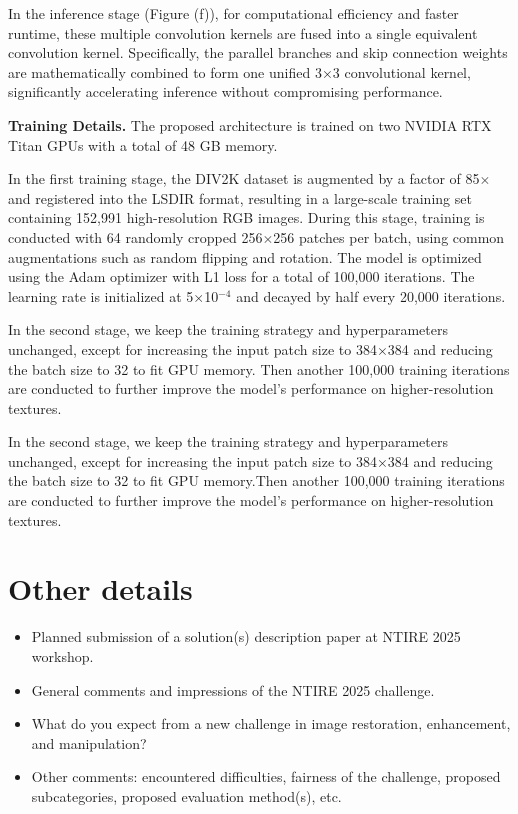 \documentclass[10pt,twocolumn,letterpaper]{article}
\begin{document}
In the inference stage (Figure (f)), for computational efficiency and faster runtime, these multiple convolution kernels are fused into a single equivalent convolution kernel. Specifically, the parallel branches and skip connection weights are mathematically combined to form one unified 3×3 convolutional kernel, significantly accelerating inference without compromising performance.

\textbf{Training Details. }  The proposed architecture is trained on two NVIDIA RTX Titan GPUs with a total of 48 GB memory. 

In the first training stage, the DIV2K dataset is augmented by a factor of 85$\times$ and registered into the LSDIR format, resulting in a large-scale training set containing 152{,}991 high-resolution RGB images. During this stage, training is conducted with 64 randomly cropped 256$\times$256 patches per batch, using common augmentations such as random flipping and rotation. The model is optimized using the Adam optimizer with L1 loss for a total of 100{,}000 iterations. The learning rate is initialized at 5$\times$10$^{-4}$ and decayed by half every 20{,}000 iterations.

In the second stage, we keep the training strategy and hyperparameters unchanged, except for increasing the input patch size to 384$\times$384 and reducing the batch size to 32 to fit GPU memory. Then another 100{,}000 training iterations are conducted to further improve the model’s performance on higher-resolution textures.

In the second stage, we keep the training strategy and hyperparameters unchanged, except for increasing the input patch size to 384×384 and reducing the batch size to 32 to fit GPU memory.Then another 100,000 training iterations are conducted to further improve the model’s performance on higher-resolution textures.


\section{Other details}
\begin{itemize}
\item Planned submission of a solution(s) description paper at NTIRE 2025 workshop.
\item General comments and impressions of the NTIRE 2025 challenge. 
\item What do you expect from a new challenge in image restoration, enhancement, and manipulation?
\item Other comments: encountered difficulties, fairness of the challenge, proposed subcategories, proposed evaluation method(s), etc.
\end{itemize}

{\small


}
\end{document}
